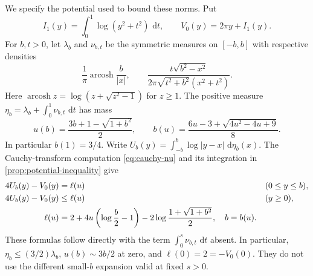\documentclass[11pt,letterpaper]{article}
\theoremstyle{definition}
\newcommand{\dd}{\,\mathrm d}
\DeclareMathOperator{\arcosh}{arcosh}
\begin{document}
We specify the potential used to bound these norms. Put
\[
 I_1(y)=\int_0^1\log(y^2+t^2)\,\dd t,\qquad
 V_0(y)=2\pi y+I_1(y).
\]
For $b,t>0$, let $\lambda_b$ and $\nu_{b,t}$ be the symmetric measures
on $[-b,b]$ with respective densities
\[
 \frac1\pi\arcosh\frac b{|x|},\qquad
 \frac{t\sqrt{b^2-x^2}}
 {2\pi\sqrt{t^2+b^2}(x^2+t^2)}.
\]
Here $\arcosh z=\log(z+\sqrt{z^2-1})$ for $z\ge1$.
The positive measure
$\eta_b=\lambda_b+\int_0^1\nu_{b,t}\,\dd t$ has mass
\begin{equation}\label{eq:z3-mass}
 u(b)=\frac{3b+1-\sqrt{1+b^2}}2,
 \qquad
 b(u)=\frac{6u-3+\sqrt{4u^2-4u+9}}8.
\end{equation}
In particular $b(1)=3/4$. Write
$U_b(y)=\int_{-b}^b\log|y-x|\,\dd\eta_b(x)$.
The Cauchy-transform computation \eqref{eq:cauchy-nu} and its
integration in \cref{prop:potential-inequality} give
\begin{align}
 4U_b(y)-V_0(y)&=\ell(u) &&(0\le y\le b),\notag\\
 4U_b(y)-V_0(y)&\le\ell(u) &&(y\ge0),\notag\\
 \ell(u)&=2+4u\left(\log\frac b2-1\right)
              -2\log\frac{1+\sqrt{1+b^2}}2,\quad b=b(u).
 \label{eq:z3-potential}
\end{align}
These formulas follow directly with the term $\int_0^s\nu_{b,t}\,\dd t$
absent. In particular, $\eta_b\le(3/2)\lambda_b$,
$u(b)\sim3b/2$ at zero, and $\ell(0)=2=-V_0(0)$.
They do not use the different small-$b$ expansion valid at fixed $s>0$.
\end{document}
